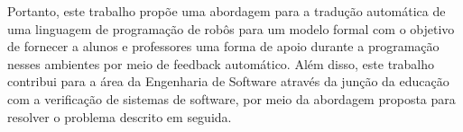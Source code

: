 Portanto, este trabalho propõe uma abordagem para a tradução automática de uma
linguagem de programação de robôs para um modelo formal com o objetivo de fornecer a
alunos e professores uma forma de apoio durante a programação nesses ambientes por meio de feedback automático. Além disso, este trabalho contribui para a área da Engenharia de Software através da junção da educação com a verificação de sistemas de software, por meio da abordagem proposta para resolver o problema descrito em seguida.
